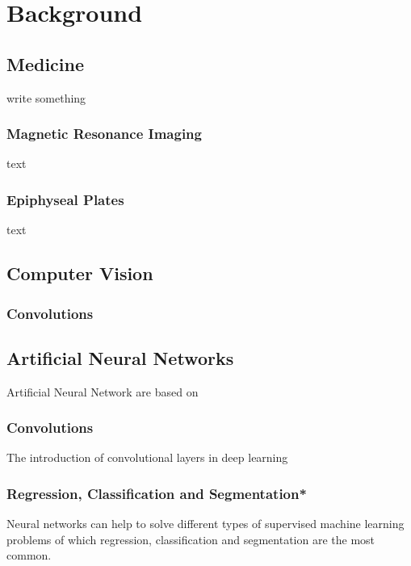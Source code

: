 \section{Background}

\subsection{Medicine}

write something

\subsubsection{Magnetic Resonance Imaging}

text

\subsubsection{Epiphyseal Plates}

text

\subsection{Computer Vision}

\subsubsection{Convolutions}

\subsection{Artificial Neural Networks}

Artificial Neural Network are based on 

\subsubsection{Convolutions}

The introduction of convolutional layers in deep learning 

\subsubsection{Regression, Classification and Segmentation*}

Neural networks can help to solve different types of supervised machine learning problems of which regression, classification and segmentation are the most common.


